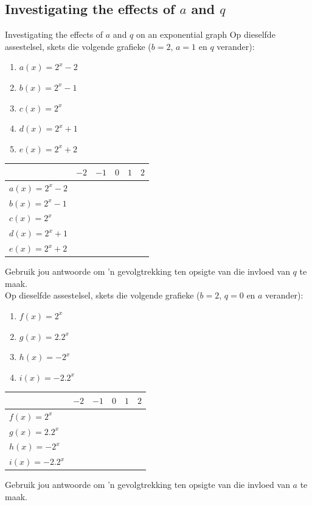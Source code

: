 \subsection*{Investigating the effects of $a$ and $q$}
\begin{Investigation}{Investigating the effects of $a$ and $q$ on an exponential graph}
Op dieselfde assestelsel, skets die volgende grafieke ($b=2$, $a=1$ en $q$ verander):
\begin{enumerate}[noitemsep, label=\textbf{\alph*}. ] 
\item $a(x)=2^{x}-2$
\item $b(x)=2^{x}-1$
\item $c(x)=2^{x}$
\item $d(x)=2^{x}+1$
\item $e(x)=2^{x}+2$
\end{enumerate}

\begin{table}[H]
\begin{center}
\begin{tabular}{|l|c|c|c|c|c|}
\hline
   &  $-2$ & $-1$ & $0$ & $1$ & $2$ 
\\ \hline
$a(x)=2^{x}-2$&  &&&&
\\ \hline
 $b(x)=2^{x}-1$&  &&&&
\\ \hline
$c(x)=2^{x}$&  &&&&
\\ \hline
$d(x)=2^{x}+1$&  &&&&
\\ \hline
$e(x)=2^{x}+2$&  &&&&
\\ \hline
\end{tabular}
\end{center}
\end{table}
Gebruik jou antwoorde om ’n gevolgtrekking ten opsigte van die invloed van $q$ te maak.
\\

Op dieselfde assestelsel, skets die volgende grafieke ($b=2$, $q=0$ en $a$ verander):
\begin{enumerate}[noitemsep, label=\textbf{\arabic*}. ] 
\item $f(x)=2^{x}$
\item $g(x)=2.2^{x}$
\item $h(x)=-2^{x}$
\item $i(x)=-2.2^{x}$
\end{enumerate}

\begin{table}[H]
\begin{center}
\begin{tabular}{|l|c|c|c|c|c|}
\hline
   &  $-2$ & $-1$ & $0$ & $1$ & $2$ 
\\ \hline
$f(x)=2^{x}$&  &&&&
\\ \hline
$g(x)=2.2^{x}$&  &&&&
\\ \hline
 $h(x)=-2^{x}$&  &&&&
\\ \hline
$i(x)=-2.2^{x}$&  &&&&
\\ \hline

\end{tabular}
\end{center}
\end{table}
Gebruik jou antwoorde om ’n gevolgtrekking ten opsigte van die invloed van $a$ te maak.
\end{Investigation}


